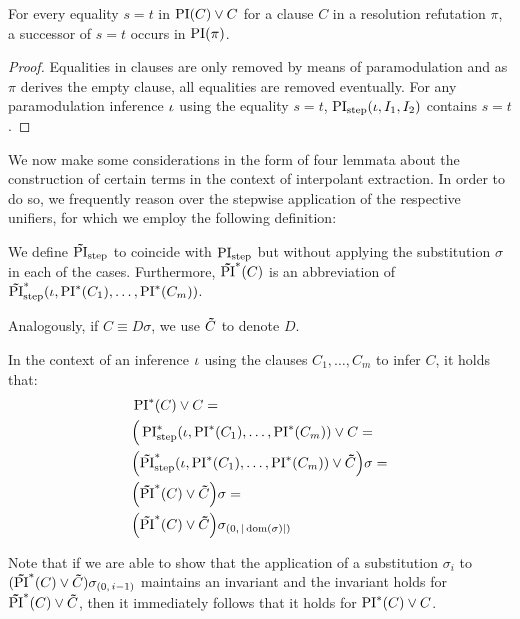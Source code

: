 \documentclass[%
	draft=false,%
	numbers=noendperiod,%
	11pt,%
	a4paper,%
	oneside,%
	openany,%
]{memoir}
\begin{document}
\begin{lemma}
	\label{lemma:equalities_all_in_PI}
	For every equality $s=t$ in $\operatorname{PI}(C) \lor C$ for a clause $C$ in a resolution refutation $\pi$,
	a successor of $s=t$ occurs in $\operatorname{PI}(\pi)$.
\end{lemma}
\begin{proof}
	Equalities in clauses are only removed by means of paramodulation and as $\pi$ derives the empty clause, all equalities are removed eventually.
	For any paramodulation inference $\iota$ using the equality $s=t$, $\operatorname{PI}_{\mathrm{step}}(\iota, I_1, I_2)$ contains $s=t$. 
\end{proof}


We now make some considerations in the form of four lemmata about the construction of certain terms in the context of interpolant extraction.
In order to do so, we frequently reason over the stepwise application of the respective unifiers, for which we employ the following definition:

\begin{defi}
	We define $\bm\tilde{\operatorname{PI}}_{\mathrm{step}}$ to coincide with $\operatorname{PI}_{\mathrm{step}}$ but without applying the substitution $\sigma$ in each of the cases.
	Furthermore, $\bm\tilde{\operatorname{PI}}^{*}(C)$ is an abbreviation of $\bm\tilde{\operatorname{PI}}^{*}_{\mathrm{step}}(\iota, \operatorname{PI}^*(C_1), \dots, \operatorname{PI}^*(C_m))$.

	Analogously, if $C \equiv D\sigma$, we use $\bm\tilde{C}$ to denote\nolinebreak{} $D$.
\end{defi}

In the context of an inference $\iota$ using the clauses $C_1, \dots, C_m$ to infer $C$, it holds that:
\begin{align*}
	& \operatorname{PI}^*(C) \lor C = \\
	& \Big(\operatorname{PI}_{\mathrm{step}}^*(\iota, \operatorname{PI}^*(C_1), \dots, \operatorname{PI}^*(C_m)) \lor C = \\
	& \Big(\bm\tilde{\operatorname{PI}}^{*}_{\mathrm{step}}(\iota, \operatorname{PI}^*(C_1), \dots, \operatorname{PI}^*(C_m)) \lor \bm\tilde{C} \Big) \sigma = \\
	& \Big(\bm\tilde{\operatorname{PI}}^{*}(C)\lor \bm\tilde{C} \Big) \sigma = \\
	& \Big(\bm\tilde{\operatorname{PI}}^{*}(C)\lor \bm\tilde{C} \Big) \sigma_{(0,\,|\operatorname{dom}(\sigma)|)}
\end{align*}

\newcommand{\inv}{\ensuremath{\PIstarnosigma(C)\lor \nosigma{C}}}
\newcommand{\invp}{\ensuremath{(\inv)}}


Note that if we are able to show that the application of a substitution $\sigma_i$ to $\invp\sigmazmi$ maintains an invariant and the invariant holds for $\inv$, then it immediately follows that it holds for $\operatorname{PI}^*(C) \lor C$. 
\end{document}
